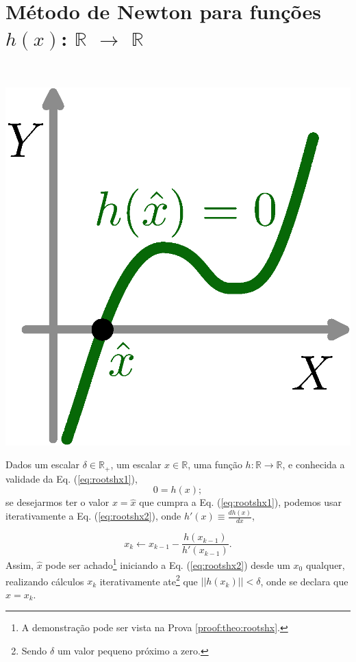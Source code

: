 
\section{ Método de Newton para funções $h(x)$: $\mathbb{R}$ $\rightarrow$ $\mathbb{R}$ }

\begin{theorem}\label{theo:rootshx}
~\\
\begin{minipage}{0.20\textwidth}
\centering
\includegraphics[width=0.9\linewidth]{chapters/roots/roots1.eps} 
\end{minipage}
\begin{minipage}{0.8\textwidth}
Dados
um escalar $\delta \in \mathbb{R}_+$, 
um escalar $x \in \mathbb{R}$, 
uma função $h:\mathbb{R} \rightarrow \mathbb{R}$, e 
conhecida a validade da Eq. (\ref{eq:rootshx1}),
\begin{equation}\label{eq:rootshx1}
0=h(x);
\end{equation}
se desejarmos ter o valor $x=\hat{x}$ que cumpra a Eq. (\ref{eq:rootshx1}),
podemos usar iterativamente a Eq. (\ref{eq:rootshx2}),
onde  $h'(x)\equiv \frac{d h(x)}{d x}$,
\end{minipage}

\begin{equation}\label{eq:rootshx2}
x_{k} \leftarrow x_{k-1}-\frac{ h(x_{k-1})}{h'(x_{k-1})}.
\end{equation}
Assim, $\hat{x}$ pode ser achado\footnote{A 
demonstração pode ser vista na Prova \ref{proof:theo:rootshx}.} 
iniciando a Eq. (\ref{eq:rootshx2}) desde um 
$x_{0}$ qualquer, realizando cálculos $x_{k}$ iterativamente  
ate\footnote{Sendo $\delta$ um valor pequeno próximo a zero.} que $||h(x_k)||<\delta$,
onde se declara que $\hat{x}=x_k$.


\end{theorem}
